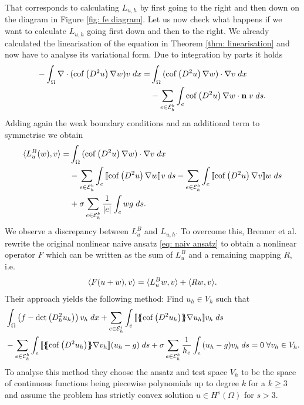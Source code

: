 That corresponds to calculating $L_{u,h}$ by first going to the right and then down on the diagram in Figure \ref{fig: fe diagram}. Let us now check what happens if we want to calculate $L_{u,h}$ going first down and then to the right.
We already calculated the linearisation of the \MA equation in Theorem \ref{thm: linearisation} and now have to analyse its variational form. Due to integration by parts it holds
\begin{align*}
  -\int_{\Omega} {{ \nabla \cdot (\operatorname{cof} \left( D^2 u \right) \nabla w) v}\;dx}
  	=& \int_{\Omega} {{ (\operatorname{cof} \left( D^2 u \right) \nabla w) \cdot \nabla v}\;dx} \\
  	 &	- \sum_{e \in \mathcal{E}_h^b} \int_{e} {{ \operatorname{cof} \left( D^2 u \right) \nabla w \cdot \mathbf n \; v}\;ds}.
\end{align*}
Adding again the weak boundary conditions and an additional term to symmetrise we obtain %
\begin{align}
	\langle L^B_{u}(w),v\rangle 
	    =& \int_{\Omega} {{(\operatorname{cof} \left( D^2 u \right) \nabla w) \cdot \nabla v}\;dx} \nonumber \\
	    	&- \sum_{e \in \mathcal{E}_h^b} \int_{e} {{ \llbracket  \operatorname{cof} \left( D^2 u \right) \nabla w \rrbracket v}\;ds} 
	    	- \sum_{e \in \mathcal{E}_h^b} \int_{e} {{ \llbracket \operatorname{cof} \left( D^2 u \right) \nabla v \rrbracket w}\;ds} \nonumber \\
	    	& + \sigma \sum_{e \in \mathcal{E}_h^b} \frac 1 {|e|} \int_{e} {{{w}{g}}\;ds}. \label{eq: var of linearisation}
\end{align}
We observe a discrepancy between $L^B_{u}$ and $L_{u,h}$. To overcome this, Brenner et al. rewrite the original nonlinear naive ansatz \eqref{eq: naiv ansatz} to obtain a nonlinear operator $F$ which can be written as the sum of $L^B_{u}$ and a remaining mapping $R$, i.e.
\begin{align}
	 \langle F (u+w), v \rangle =  \langle L^B_{u}w, v \rangle +  \langle Rw, v \rangle. \label{eq: brenner entwicklung}
\end{align}
Their approach yields the following method: Find $u_h \in V_h$ such that
\begin{align}
\begin{split}
	&\myIntX {\Omega} {\left(f-\mydet {D^2_h u_h}\right) v_h} 
	+ \sum_{e \in \edgesi} \myIntS e { \jump{ \average{\mycof{D^2 u_h} } \nabla u_h } v_h} \\
	&- \sum_{e \in \edgesb} \myIntS e { \jump{ \average{\mycof{D^2 u_h} } \nabla v_h } (u_h -g)} 
	+ \sigma  \sum_{e \in \edgesb} \frac 1 {h_e} \myIntS e { (u_h -g)v_h}  = 0 \; \forall v_h \in V_h. \label{eq: brenner method}
\end{split}
\end{align}
To analyse this method they choose the ansatz and test space $V_h$ to be the space of continuous functions being piecewise polynomials up to degree $k$ for a $k \geq 3$ and assume the \MA problem has strictly convex solution $u\in H^s(\Omega)$ for $s>3$. %

